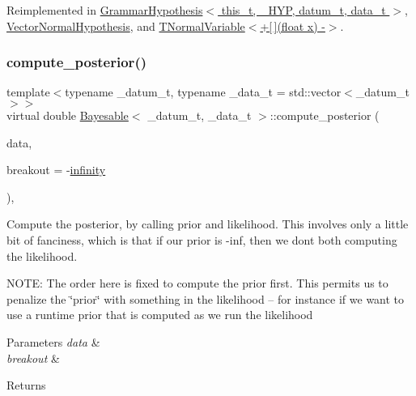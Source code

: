 Reimplemented in \hyperlink{class_grammar_hypothesis_a769eea50d9e40668022b120b6fddfe06}{Grammar\+Hypothesis$<$ this\+\_\+t, \+\_\+\+H\+Y\+P, datum\+\_\+t, data\+\_\+t $>$}, \hyperlink{class_vector_normal_hypothesis_a8d705b46b3644217f5beac10a4d36f8d}{Vector\+Normal\+Hypothesis}, and \hyperlink{class_t_normal_variable_a77e4954e8d30140fce241eca6d9abfa2}{T\+Normal\+Variable$<$+\mbox{[}$\,$\mbox{]}(float x) -\/$>$}.

\mbox{\label{class_bayesable_a0b0552923602bcab6c768581ab8c7df8}} 
\subsubsection{\texorpdfstring{compute\+\_\+posterior()}{compute\_posterior()}}
{\footnotesize\ttfamily template$<$typename \+\_\+datum\+\_\+t, typename \+\_\+data\+\_\+t = std\+::vector$<$\+\_\+datum\+\_\+t$>$$>$ \\
virtual double \hyperlink{class_bayesable}{Bayesable}$<$ \+\_\+datum\+\_\+t, \+\_\+data\+\_\+t $>$\+::compute\+\_\+posterior (\begin{DoxyParamCaption}\item[{const \hyperlink{class_bayesable_aa2788c4d7718c0a824e1d28c4c98f921}{data\+\_\+t} \&}]{data,  }\item[{const double}]{breakout = {\ttfamily -\/\hyperlink{_numerics_8h_af9434aea82baf2f6a5d9b6f9e36db08e}{infinity}} }\end{DoxyParamCaption})\hspace{0.3cm}{\ttfamily [inline]}, {\ttfamily [virtual]}}



Compute the posterior, by calling prior and likelihood. This involves only a little bit of fanciness, which is that if our prior is -\/inf, then we don\textquotesingle{}t both computing the likelihood. 

N\+O\+TE\+: The order here is fixed to compute the prior first. This permits us to penalize the \char`\"{}prior\char`\"{} with something in the likelihood -- for instance if we want to use a runtime prior that is computed as we run the likelihood 
\begin{DoxyParams}{Parameters}
{\em data} & \\
\hline
{\em breakout} & \\
\hline
\end{DoxyParams}
\begin{DoxyReturn}{Returns}

\end{DoxyReturn}
\mbox{\label{class_bayesable_a1b057a17212ced123545133e2297c01b}} 
